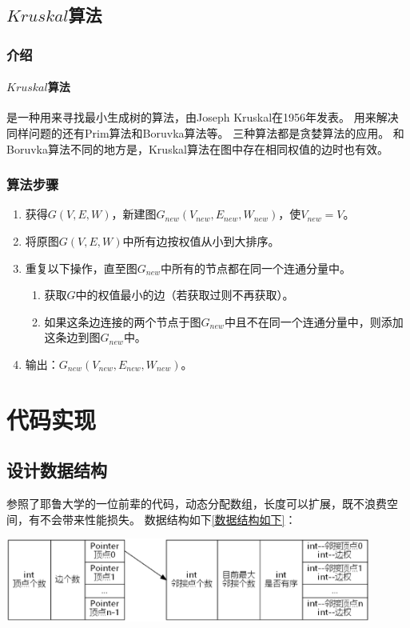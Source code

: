 \documentclass[a4paper,10pt]{ctexart}
\begin{document}
\subsection{$Kruskal$算法}
\subsubsection{介绍}
\paragraph{$Kruskal$算法}是一种用来寻找最小生成树的算法，由Joseph Kruskal在1956年发表。
用来解决同样问题的还有Prim算法和Boruvka算法等。
三种算法都是贪婪算法的应用。
和Boruvka算法不同的地方是，Kruskal算法在图中存在相同权值的边时也有效。
\subsubsection{算法步骤}
\begin{enumerate}
  \item 获得$G(V,E,W)$，新建图$G_{new}(V_{new},E_{new},W_{new})$，使$V_{new} = V$。
  \item 将原图$G(V,E,W)$中所有边按权值从小到大排序。
  \item 重复以下操作，直至图$G_{new}$中所有的节点都在同一个连通分量中。
      \begin{enumerate}
       \item 获取$G$中的权值最小的边（若获取过则不再获取）。
       \item 如果这条边连接的两个节点于图$G_{new}$中且不在同一个连通分量中，则添加这条边到图$G_{new}$中。
      \end{enumerate}
  \item 输出：$G_{new}(V_{new},E_{new},W_{new})$。
\end{enumerate}


\section{代码实现}
\subsection{设计数据结构}
参照了耶鲁大学的一位前辈的代码，动态分配数组，长度可以扩展，既不浪费空间，有不会带来性能损失。
数据结构如下\ref{数据结构如下}：

\includegraphics[width=0.9\textwidth]{../Pics/DataStruct.eps}
\end{document}
